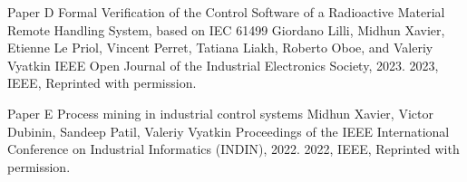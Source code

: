 \documentclass[12pt,a4paper,openright,final,twoside]{cseethesis}
\begin{document}

\makepaperaccepted
  {\paperheader}
  {\papertitle}
  {\paperauthorstring}
  {}
  {\copyrightstring}



\def\paperheader{Paper D}
\def\papertitle{Formal Verification of the Control Software of a Radioactive Material Remote Handling System, based on IEC 61499}
\def\paperauthorstring{Giordano Lilli, Midhun Xavier, Etienne Le Priol, Vincent Perret, Tatiana Liakh, Roberto Oboe, and Valeriy Vyatkin}
\def\referencestring{IEEE Open Journal of the Industrial Electronics Society, 2023.}
\def\copyrightstring{2023, IEEE, Reprinted with permission.}


\makepaperaccepted
  {\paperheader}
  {\papertitle}
  {\paperauthorstring}
  {\referencestring}
  {\copyrightstring}



\def\paperheader{Paper E}
\def\papertitle{Process mining in industrial control systems}
\def\paperauthorstring{Midhun Xavier, Victor Dubinin, Sandeep Patil, Valeriy Vyatkin}
\def\referencestring{Proceedings of the IEEE International Conference on Industrial Informatics (INDIN), 2022.}
\def\copyrightstring{2022, IEEE, Reprinted with permission.}


\makepaperaccepted
  {\paperheader}
  {\papertitle}
  {\paperauthorstring}
  {\referencestring}
  {\copyrightstring}


\end{document}
